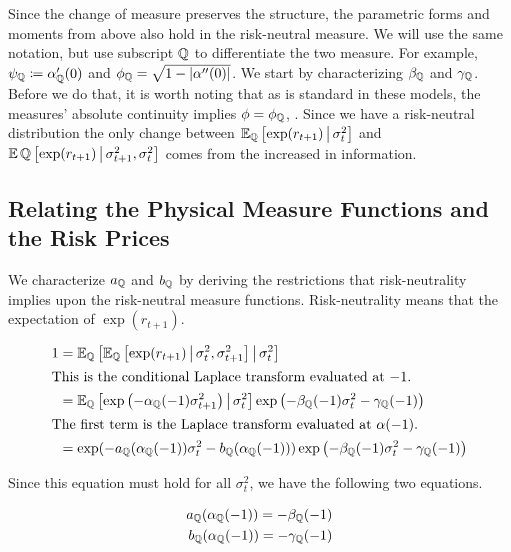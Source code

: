 \documentclass[11pt, letterpaper, twoside, final]{article}
\begin{document}
Since the change of measure preserves the structure, the parametric forms and moments from above also hold in the
risk-neutral measure.
We will use the same notation, but use subscript $\QQ$ to differentiate the two measure. 
For example, $\psi_{\QQ} \coloneqq \alpha_{\QQ}'(0)$ and $\phi_{\QQ} = \sqrt{1 - \abs*{\alpha''(0)}}$.
We start by characterizing $\beta_{\QQ}$ and $\gamma_{\QQ}$.
Before we do that, it is worth noting that as is standard in these models, the measures' absolute continuity
implies $\phi = \phi_{\QQ}$, \parencite[17]{khrapov2016affine}.
Since we have a risk-neutral distribution the only change between $\E_{\QQ}\left[\exp(r_{t+1}) \mvert
\sigma^2_t\right]$ and $\E{\QQ}\left[\exp(r_{t+1}) \mvert \sigma^2_{t+1}, \sigma^2_t\right]$ comes from the
increased in information.

\subsection{Relating the Physical Measure Functions and the Risk Prices}

We characterize $a_{\QQ}$ and $b_{\QQ}$ by deriving the restrictions that risk-neutrality implies upon the
risk-neutral measure functions.
Risk-neutrality means that the expectation of $\exp(r_{t+1})$.

\begin{align}
    1 &= \E_{\QQ}\left[\E_{\QQ}\left[\exp(r_{t+1}) \mvert \sigma_t^2, \sigma^2_{t+1}\right]  \mvert \sigma^2_t
        \right] \\
%
      \intertext{This is the conditional Laplace transform evaluated at $-1$.}
%
      \label{eqn:risk_neutral_at_neg_1}
      &= \E_{\QQ}\left[ \exp\left(-\alpha_{\QQ}(-1) \sigma^2_{t+1}\right)  \mvert \sigma^2_t \right] 
         \exp\left(-\beta_{\QQ}(-1) \sigma^2_t - \gamma_{\QQ}(-1)\right)   \\
%
      \intertext{The first term is the Laplace transform evaluated at $\alpha(-1)$.}
%
      &= \exp(-a_{\QQ}(\alpha_{\QQ}(-1)) \sigma^2_t - b_{\QQ}(\alpha_{\QQ}(-1))) \exp\left(-\beta_{\QQ}(-1)
         \sigma^2_t - \gamma_{\QQ}(-1)\right)  
\end{align}

Since this equation must hold for all $\sigma_t^2$, we have the following two equations.

\begin{align}
    a_{\QQ}(\alpha_{\QQ}(-1)) = - \beta_{\QQ}(-1) \\
    b_{\QQ}(\alpha_{\QQ}(-1)) = - \gamma_{\QQ}(-1) 
\end{align}
\end{document}
